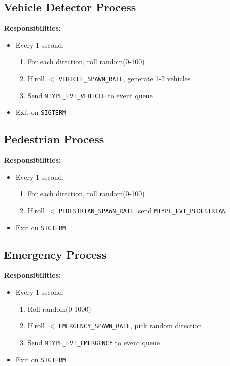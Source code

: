 \documentclass[11pt,a4paper]{article}
\begin{document}
\subsection{Vehicle Detector Process}
\textbf{Responsibilities:}
\begin{itemize}[noitemsep]
    \item Every 1 second:
    \begin{enumerate}[noitemsep]
        \item For each direction, roll random(0-100)
        \item If roll $<$ \texttt{VEHICLE\_SPAWN\_RATE}, generate 1-2 vehicles
        \item Send \texttt{MTYPE\_EVT\_VEHICLE} to event queue
    \end{enumerate}
    \item Exit on \texttt{SIGTERM}
\end{itemize}

\subsection{Pedestrian Process}
\textbf{Responsibilities:}
\begin{itemize}[noitemsep]
    \item Every 1 second:
    \begin{enumerate}[noitemsep]
        \item For each direction, roll random(0-100)
        \item If roll $<$ \texttt{PEDESTRIAN\_SPAWN\_RATE}, send \texttt{MTYPE\_EVT\_PEDESTRIAN}
    \end{enumerate}
    \item Exit on \texttt{SIGTERM}
\end{itemize}

\subsection{Emergency Process}
\textbf{Responsibilities:}
\begin{itemize}[noitemsep]
    \item Every 1 second:
    \begin{enumerate}[noitemsep]
        \item Roll random(0-1000)
        \item If roll $<$ \texttt{EMERGENCY\_SPAWN\_RATE}, pick random direction
        \item Send \texttt{MTYPE\_EVT\_EMERGENCY} to event queue
    \end{enumerate}
    \item Exit on \texttt{SIGTERM}
\end{itemize}
\end{document}
